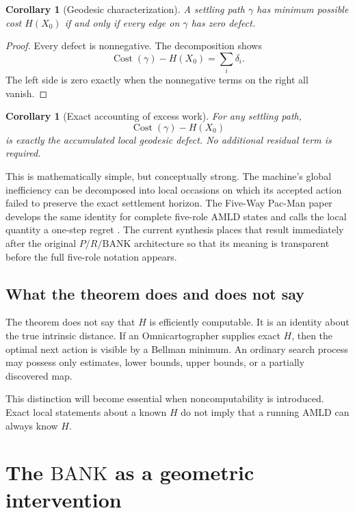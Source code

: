\documentclass[11pt]{article}
\newtheorem{corollary}[definition]{Corollary}
\theoremstyle{remark}
\newcommand{\BANK}{\ensuremath{\mathrm{BANK}}}
\newcommand{\Cost}{\operatorname{Cost}}
\begin{document}
\begin{corollary}[Geodesic characterization]
A settling path $\gamma$ has minimum possible cost $H(X_0)$ if and only if every edge on $\gamma$ has zero defect.
\end{corollary}

\begin{proof}
Every defect is nonnegative. The decomposition shows
\[
\Cost(\gamma)-H(X_0)=\sum_i\delta_i.
\]
The left side is zero exactly when the nonnegative terms on the right all vanish.
\end{proof}

\begin{corollary}[Exact accounting of excess work]
For any settling path,
\[
\Cost(\gamma)-H(X_0)
\]
is exactly the accumulated local geodesic defect. No additional residual term is required.
\end{corollary}

This is mathematically simple, but conceptually strong. The machine's global inefficiency can be decomposed into local occasions on which its accepted action failed to preserve the exact settlement horizon. The Five-Way Pac-Man paper develops the same identity for complete five-role AMLD states and calls the local quantity a one-step regret \cite{TennesonPacMan}. The current synthesis places that result immediately after the original $P/R/\BANK$ architecture so that its meaning is transparent before the full five-role notation appears.

\subsection{What the theorem does and does not say}

The theorem does not say that $H$ is efficiently computable. It is an identity about the true intrinsic distance. If an Omnicartographer supplies exact $H$, then the optimal next action is visible by a Bellman minimum. An ordinary search process may possess only estimates, lower bounds, upper bounds, or a partially discovered map.

This distinction will become essential when noncomputability is introduced. Exact local statements about a known $H$ do not imply that a running AMLD can always know $H$.

\section{The \texorpdfstring{\BANK}{BANK} as a geometric intervention}
\end{document}
